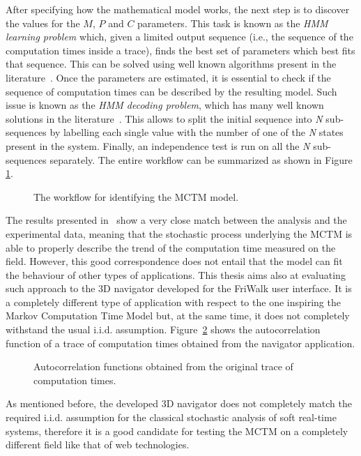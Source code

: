 After specifying how the mathematical model works, the next step is to discover
the values for the \(M\), \(P\) and \(C\) parameters. This task is known as the
\emph{HMM learning problem} which, given a limited output sequence (i.e., the
sequence of the computation times inside a trace),
finds the best set of parameters which best fits that sequence.
This can be solved using well known algorithms present in the
literature~\cite{baum1972inequality}.
Once the parameters are estimated, it is essential to check if the sequence of
computation times can be described by the resulting model.
Such issue is known as the \emph{HMM decoding problem}, which has many well
known solutions in the literature~\cite{forney1973viterbi}. This allows to split
the initial sequence into \emph{N} sub-sequences by labelling each single value
with the number of one of the \emph{N} states present in the system.
Finally, an independence test is run on all the \emph{N} sub-sequences separately.
The entire workflow can be summarized as shown in Figure \ref{img:hmm_workflow}.
\begin{figure}[!htb]
    \caption{The workflow for identifying the MCTM model.}
    \label{img:hmm_workflow}
\end{figure}

The results presented in~\cite{villalba2017probabilistic} show a very close match
between the analysis and the experimental data, meaning that the stochastic
process underlying the MCTM is able to properly describe the trend of the
computation time measured on the field.
However, this good correspondence does not entail that the model can fit the
behaviour of other types of applications. This thesis aims also at evaluating such
approach to the 3D navigator developed for the FriWalk user interface.
It is a completely different type of application with respect to the one
inspiring the Markov Computation Time Model but, at the same time, it does not
completely withstand the usual i.i.d. assumption. Figure~\ref{img:mctm_1_state} shows the autocorrelation function of a trace of computation times obtained from the navigator application.
\begin{figure}[!htb]
    \caption{Autocorrelation functions obtained from the original trace of computation times.}
    \label{img:mctm_1_state}
\end{figure}

As mentioned before, the developed 3D navigator does not completely match the required i.i.d. assumption for the classical stochastic analysis of soft real-time systems, therefore it is a good candidate for testing the MCTM on a completely different field like that of web technologies.

